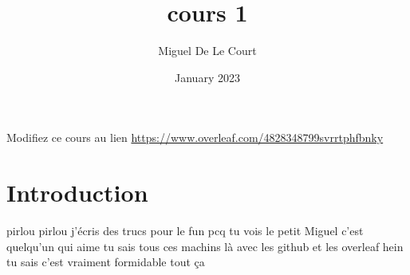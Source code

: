 \documentclass{article}
\title{cours 1}
\author{Miguel De Le Court}
\date{January 2023}
\begin{document}
\maketitle
Modifiez ce cours au lien \url{https://www.overleaf.com/4828348799svrrtphfbnky}

\section{Introduction}


pirlou pirlou j'écris des trucs pour le fun pcq tu vois le petit Miguel c'est quelqu'un qui aime tu sais tous ces machins là avec les github et les overleaf hein tu sais c'est vraiment formidable tout ça
\end{document}
